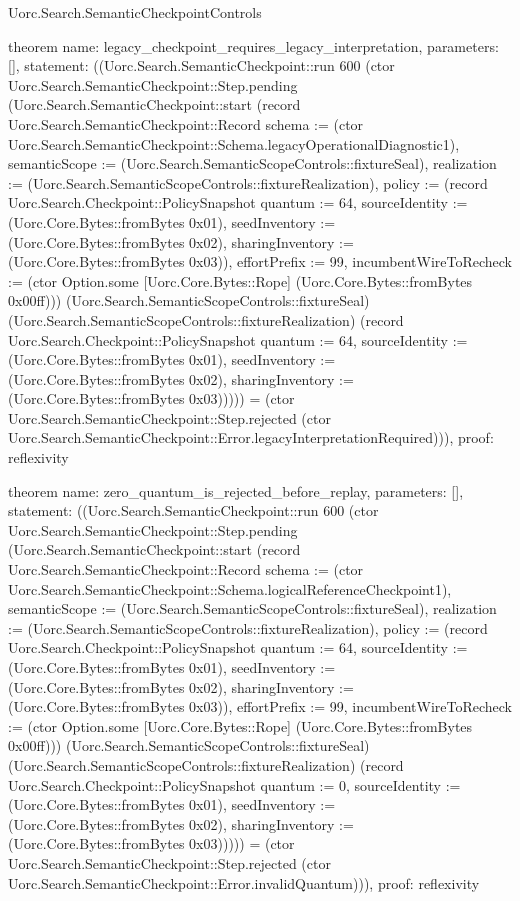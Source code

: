 \begin{lexlean}{Uorc.Search.SemanticCheckpointControls}
\begin{semanticmodule}
theorem{
  name: legacy_checkpoint_requires_legacy_interpretation,
  parameters: [],
  statement: ((Uorc.Search.SemanticCheckpoint::run 600 (ctor Uorc.Search.SemanticCheckpoint::Step.pending (Uorc.Search.SemanticCheckpoint::start (record Uorc.Search.SemanticCheckpoint::Record {schema := (ctor Uorc.Search.SemanticCheckpoint::Schema.legacyOperationalDiagnostic1), semanticScope := (Uorc.Search.SemanticScopeControls::fixtureSeal), realization := (Uorc.Search.SemanticScopeControls::fixtureRealization), policy := (record Uorc.Search.Checkpoint::PolicySnapshot {quantum := 64, sourceIdentity := (Uorc.Core.Bytes::fromBytes 0x01), seedInventory := (Uorc.Core.Bytes::fromBytes 0x02), sharingInventory := (Uorc.Core.Bytes::fromBytes 0x03)}), effortPrefix := 99, incumbentWireToRecheck := (ctor Option.some [Uorc.Core.Bytes::Rope] (Uorc.Core.Bytes::fromBytes 0x00ff))}) (Uorc.Search.SemanticScopeControls::fixtureSeal) (Uorc.Search.SemanticScopeControls::fixtureRealization) (record Uorc.Search.Checkpoint::PolicySnapshot {quantum := 64, sourceIdentity := (Uorc.Core.Bytes::fromBytes 0x01), seedInventory := (Uorc.Core.Bytes::fromBytes 0x02), sharingInventory := (Uorc.Core.Bytes::fromBytes 0x03)})))) = (ctor Uorc.Search.SemanticCheckpoint::Step.rejected (ctor Uorc.Search.SemanticCheckpoint::Error.legacyInterpretationRequired))),
  proof: reflexivity{}
}

theorem{
  name: zero_quantum_is_rejected_before_replay,
  parameters: [],
  statement: ((Uorc.Search.SemanticCheckpoint::run 600 (ctor Uorc.Search.SemanticCheckpoint::Step.pending (Uorc.Search.SemanticCheckpoint::start (record Uorc.Search.SemanticCheckpoint::Record {schema := (ctor Uorc.Search.SemanticCheckpoint::Schema.logicalReferenceCheckpoint1), semanticScope := (Uorc.Search.SemanticScopeControls::fixtureSeal), realization := (Uorc.Search.SemanticScopeControls::fixtureRealization), policy := (record Uorc.Search.Checkpoint::PolicySnapshot {quantum := 64, sourceIdentity := (Uorc.Core.Bytes::fromBytes 0x01), seedInventory := (Uorc.Core.Bytes::fromBytes 0x02), sharingInventory := (Uorc.Core.Bytes::fromBytes 0x03)}), effortPrefix := 99, incumbentWireToRecheck := (ctor Option.some [Uorc.Core.Bytes::Rope] (Uorc.Core.Bytes::fromBytes 0x00ff))}) (Uorc.Search.SemanticScopeControls::fixtureSeal) (Uorc.Search.SemanticScopeControls::fixtureRealization) (record Uorc.Search.Checkpoint::PolicySnapshot {quantum := 0, sourceIdentity := (Uorc.Core.Bytes::fromBytes 0x01), seedInventory := (Uorc.Core.Bytes::fromBytes 0x02), sharingInventory := (Uorc.Core.Bytes::fromBytes 0x03)})))) = (ctor Uorc.Search.SemanticCheckpoint::Step.rejected (ctor Uorc.Search.SemanticCheckpoint::Error.invalidQuantum))),
  proof: reflexivity{}
}


\end{semanticmodule}
\end{lexlean}
